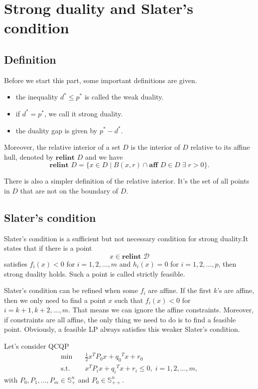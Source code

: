 \documentclass[lang=en,color=blue,mode=fancy,titlestyle=hang]{elegantbook}
\begin{document}
\section{Strong duality and Slater's condition}
\subsection{Definition}
Before we start this part, some important definitions are given.
\begin{itemize}
  \item the inequality $d^* \leq p^*$ is called the weak duality.
  \item if $d^* = p^*$, we call it strong duality.
  \item the duality gap is given by $p^* - d^*$.
\end{itemize}

Moreover, the relative interior of a set $D$ is the interior of $D$ relative to its affine hull,
denoted by $\textbf{relint } D$ and we have
\[
\textbf{relint } D = \{ x \in D \;|\; B(x,r) \cap \textbf{aff } D \in D \; \exists \; r > 0 \}.
\]

There is also a simpler definition of the relative interior. It's the set of all points in
$D$ that are not on the boundary of $D$.

\subsection{Slater's condition}

Slater's condition is a sufficient but not necessary condition for strong duality.It states
that if there is a point
\[
x \in \textbf{relint } \mathcal{D}
\]
satisfies $f_i(x) < 0$ for $i = 1, 2, \ldots, m$ and $h_i(x) = 0$ for $i = 1, 2, \ldots, p$,
then strong duality holds. Such a point is called strictly feasible.

Slater's condition can be refined when some $f_i$ are affine. If the first $k$'s are affine,
then we only need to find a point $x$ such that $f_i(x) < 0$ for $i = k + 1, k + 2, \ldots, m$.
That means we can ignore the affine constraints. Moreover, if constraints are all affine,
the only thing we need to do is to find a feasible point. Obviously, a feasible LP always
satisfies this weaker Slater's condition.

Let's consider QCQP
\begin{align*}
\min \quad &\frac12 x^T P_0 x + {q_0}^T x + r_0\\
\text{s.t.} \quad &x^T P_i x + {q_i}^T x + r_i \leq 0, \; i = 1, 2, \ldots, m,
\end{align*}
with $P_0, P_1, \ldots, P_m \in \mathbb{S}^n_+$ and $P_0 \in \mathbb{S}^n_{++}$.
\end{document}
